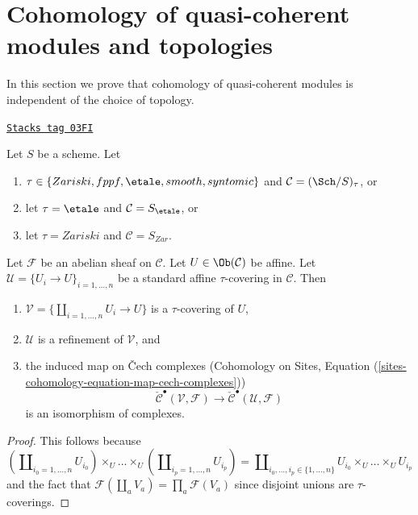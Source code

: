 \section{Cohomology of quasi-coherent modules and topologies}
\label{descent-section-quasi-coherent-cohomology}
In this section we prove that cohomology of quasi-coherent
modules is independent of the choice of topology.

\begin{lemma}
\label{descent-lemma-standard-covering-Cech}
\href{https://stacks.math.columbia.edu/tag/03FI}{\texttt{Stacks tag 03FI}}

Let $S$ be a scheme. Let
\begin{enumerate}
\item[(a)] $\tau \in \{Zariski, \linebreak[0] fppf, \linebreak[0]
\etale, \linebreak[0] smooth, \linebreak[0] syntomic\}$
and $\mathcal{C} = (\Sch/S)_\tau$, or
\item[(b)] let $\tau = \etale$ and $\mathcal{C} = S_\etale$, or
\item[(c)] let $\tau = Zariski$ and $\mathcal{C} = S_{Zar}$.
\end{enumerate}
Let $\mathcal{F}$ be an abelian sheaf on $\mathcal{C}$.
Let $U \in \Ob(\mathcal{C})$ be affine.
Let $\mathcal{U} = \{U_i \to U\}_{i = 1, \ldots, n}$ be a standard affine
$\tau$-covering in $\mathcal{C}$. Then
\begin{enumerate}
\item $\mathcal{V} = \{\coprod_{i = 1, \ldots, n} U_i \to U\}$ is a
$\tau$-covering of $U$,
\item $\mathcal{U}$ is a refinement of $\mathcal{V}$, and
\item the induced map on {\v C}ech complexes
(Cohomology on Sites,
Equation (\ref{sites-cohomology-equation-map-cech-complexes}))
$$
\check{\mathcal{C}}^\bullet(\mathcal{V}, \mathcal{F})
\longrightarrow
\check{\mathcal{C}}^\bullet(\mathcal{U}, \mathcal{F})
$$
is an isomorphism of complexes.
\end{enumerate}
\end{lemma}

\begin{proof}
This follows because
$$
(\coprod\nolimits_{i_0 = 1, \ldots, n} U_{i_0}) \times_U
\ldots \times_U
(\coprod\nolimits_{i_p = 1, \ldots, n} U_{i_p})
=
\coprod\nolimits_{i_0, \ldots, i_p \in \{1, \ldots, n\}}
U_{i_0} \times_U \ldots \times_U U_{i_p}
$$
and the fact that $\mathcal{F}(\coprod_a V_a) = \prod_a \mathcal{F}(V_a)$
since disjoint unions are $\tau$-coverings.
\end{proof}


